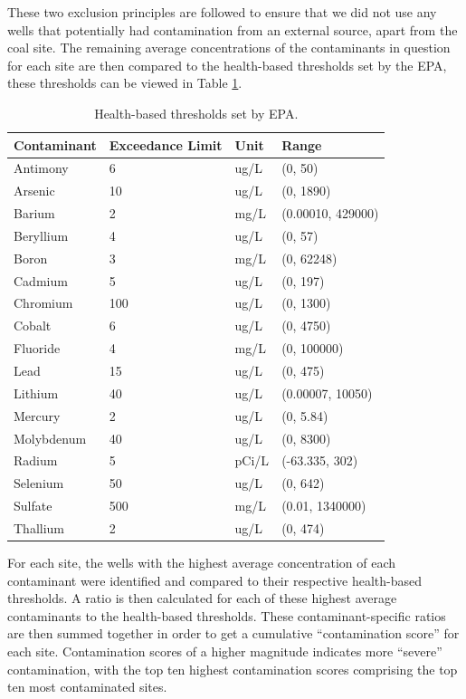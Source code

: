 \documentclass[12pt, twoside]{amherstthesis}
\begin{document}
These two exclusion principles are followed to ensure that we did not use any wells that potentially had contamination from an external source, apart from the coal site. The remaining average concentrations of the contaminants in question for each site are then compared to the health-based thresholds set by the EPA, these thresholds can be viewed in Table \ref{tab:hbt}.
\begin{table}

\caption{\label{tab:hbt}Health-based thresholds set by EPA.}
\centering
\begin{tabular}[t]{llll}
\toprule
Contaminant & Exceedance Limit & Unit & Range\\
\midrule
Antimony & 6 & ug/L & (0, 50)\\
\addlinespace
Arsenic & 10 & ug/L & (0, 1890)\\
\addlinespace
Barium & 2 & mg/L & (0.00010, 429000)\\
\addlinespace
Beryllium & 4 & ug/L & (0, 57)\\
\addlinespace
Boron & 3 & mg/L & (0, 62248)\\
\addlinespace
Cadmium & 5 & ug/L & (0, 197)\\
\addlinespace
Chromium & 100 & ug/L & (0, 1300)\\
\addlinespace
Cobalt & 6 & ug/L & (0, 4750)\\
\addlinespace
Fluoride & 4 & mg/L & (0, 100000)\\
\addlinespace
Lead & 15 & ug/L & (0, 475)\\
\addlinespace
Lithium & 40 & ug/L & (0.00007, 10050)\\
\addlinespace
Mercury & 2 & ug/L & (0, 5.84)\\
\addlinespace
Molybdenum & 40 & ug/L & (0, 8300)\\
\addlinespace
Radium & 5 & pCi/L & (-63.335, 302)\\
\addlinespace
Selenium & 50 & ug/L & (0, 642)\\
\addlinespace
Sulfate & 500 & mg/L & (0.01, 1340000)\\
\addlinespace
Thallium & 2 & ug/L & (0, 474)\\
\bottomrule
\end{tabular}
\end{table}
For each site, the wells with the highest average concentration of each contaminant were identified and compared to their respective health-based thresholds. A ratio is then calculated for each of these highest average contaminants to the health-based thresholds. These contaminant-specific ratios are then summed together in order to get a cumulative ``contamination score'' for each site. Contamination scores of a higher magnitude indicates more ``severe'' contamination, with the top ten highest contamination scores comprising the top ten most contaminated sites.
\end{document}
